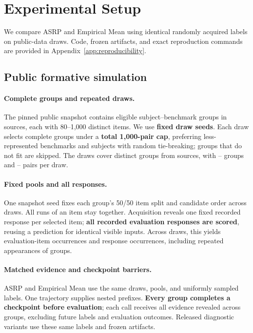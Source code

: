 \documentclass{article}
\begin{document}
\section{Experimental Setup}\label{sec:setup}

We compare ASRP and Empirical Mean using identical randomly acquired labels on public-data draws. Code, frozen artifacts, and exact reproduction commands are provided in Appendix~\ref{app:reproducibility}.

\subsection{Public formative simulation}

\paragraph{Complete groups and repeated draws.}
The pinned public snapshot contains \EligibleGroups{} eligible subject--benchmark groups in \EligibleSources{} sources, each with 80--1,000 distinct items. We use \textbf{\ProxyDraws{} fixed draw seeds}. Each draw selects complete groups under a \textbf{total 1,000-pair cap}, preferring less-represented benchmarks and subjects with random tie-breaking; groups that do not fit are skipped. The draws cover \ProxyGroups{} distinct groups from \ProxySources{} sources, with \ProxyMinGroups{}--\ProxyMaxGroups{} groups and \ProxyMinPairs{}--\ProxyMaxPairs{} pairs per draw.

\paragraph{Fixed pools and all responses.}
One snapshot seed fixes each group's 50/50 item split and candidate order across draws. All runs of an item stay together. Acquisition reveals one fixed recorded response per selected item; \textbf{all recorded evaluation responses are scored}, reusing a prediction for identical visible inputs. Across draws, this yields \ProxyTargets{} evaluation-item occurrences and \ProxyResponses{} response occurrences, including repeated appearances of groups.

\paragraph{Matched evidence and checkpoint barriers.}
ASRP and Empirical Mean use the same draws, pools, and uniformly sampled labels. One trajectory supplies nested prefixes. \textbf{Every group completes a checkpoint before evaluation}; each call receives all evidence revealed across groups, excluding future labels and evaluation outcomes. Released diagnostic variants use these same labels and frozen artifacts.
\end{document}
